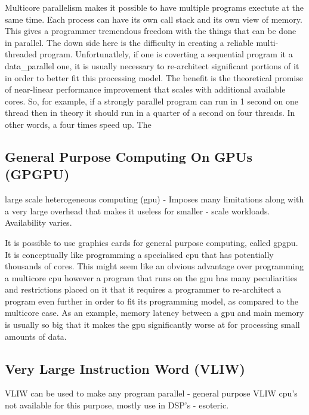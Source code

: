 Multicore parallelism makes it possible to have multiple programs exectute at
the same time. Each process can have its own call stack and its own view of
memory. This gives a programmer tremendous freedom with the things that can be
done in parallel. The down side here is the difficulty in creating a reliable
multi-threaded program. Unfortunatlely, if one is coverting a sequential
program it a \gls{data_parallel} one, it is usually necessary to re-architect
significant portions of it in order to better fit this processing model. The
benefit is the theoretical promise of near-linear performance improvement that
scales with additional available cores. So, for example, if a strongly parallel
program can run in 1 second on one thread then in theory it should run in a
quarter of a second on four threads. In other words, a four times speed up. The

\subsection{General Purpose Computing On GPUs (GPGPU)}
\begin{sectionplan}
     large scale heterogeneous computing (gpu) - Imposes many limitations along
with a very large overhead that makes it useless for smaller - scale workloads.
Availability varies.
\end{sectionplan}

It is possible to use graphics cards for general purpose computing, called
\ac{gpgpu}. It is conceptually like programming a specialised \ac{cpu} that has
potentially thousands of cores. This might seem like an obvious advantage over
programming a multicore \ac{cpu} however a program that runs on the \ac{gpu} has
many peculiarities and restrictions placed on it that it requires a programmer to
re-architect a program even further in order to fit its programming model, as
compared to the multicore case. As an example, memory latency between a \ac{gpu}
and main memory is usually so big that it makes the \ac{gpu} significantly worse
at for processing small amounts of data.

\subsection{Very Large Instruction Word (VLIW)}
\begin{sectionplan}
     VLIW can be used to make any program parallel - general purpose VLIW cpu's
not available for this purpose, mostly use in DSP's - esoteric.
\end{sectionplan}
\cite{fisher_parallel_2004}

